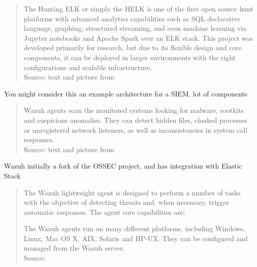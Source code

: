 \documentclass[Screen16to9,17pt]{foils}
\begin{document}


\begin{quote}\small
The Hunting ELK or simply the HELK is one of the first open source hunt platforms with advanced analytics capabilities such as SQL declarative language, graphing, structured streaming, and even machine learning via Jupyter notebooks and Apache Spark over an ELK stack. This project was developed primarily for research, but due to its flexible design and core components, it can be deployed in larger environments with the right configurations and scalable infrastructure.\\
Source: text and picture from 
\end{quote}

\begin{list2}
\item You might consider this an example architecture for a SIEM, lot of components
\end{list2}




\begin{quote}\small
Wazuh agents scan the monitored systems looking for malware, rootkits and suspicious anomalies. They can detect hidden files, cloaked processes or unregistered network listeners, as well as inconsistencies in system call responses.\\
Source: text and picture from 
\end{quote}

\begin{list2}
\item Wazuh initially a fork of the OSSEC project, and has integration with Elastic Stack
\end{list2}



\begin{quote}\small
The Wazuh lightweight agent is designed to perform a number of tasks with the objective of detecting threats and, when necessary, trigger automatic responses. The agent core capabilities are:

The Wazuh agents run on many different platforms, including Windows, Linux, Mac OS X, AIX, Solaris and HP-UX. They can be configured and managed from the Wazuh server.\\
Source: 
\end{quote}
\end{document}
